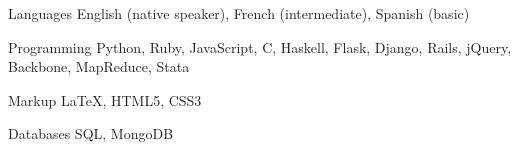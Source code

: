 \begin{cvskills}
  
  \cvskill
    {Languages}
    {English (native speaker), French (intermediate), Spanish (basic)}
  
  \cvskill
    {Programming}
    {Python, Ruby, JavaScript, C, Haskell, Flask, Django, Rails, jQuery, Backbone, MapReduce, Stata}
    
  \cvskill
    {Markup}
    {\LaTeX, HTML5, CSS3}
    
  \cvskill
    {Databases}
    {SQL, MongoDB}
  
  
\end{cvskills}


